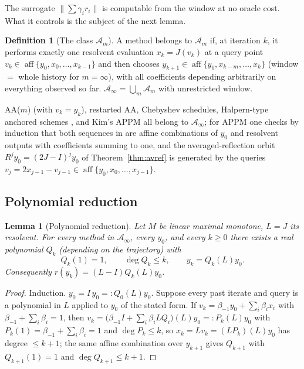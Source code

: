 \documentclass[11pt]{article}
\newtheorem{lemma}[theorem]{Lemma}
\theoremstyle{definition}
\newtheorem{definition}[theorem]{Definition}
\theoremstyle{remark}
\DeclareMathOperator{\aff}{aff}
\newcommand{\Aa}{\mathcal{A}}
\newcommand{\norm}[1]{\| #1 \|}
\begin{document}
The surrogate $\norm{\sum\gamma_i r_i}$ is computable from the window at no
oracle cost. What it controls is the subject of the next lemma.

\begin{definition}[The class $\Aa_m$]\label{def:class}
A method belongs to $\Aa_m$ if, at iteration $k$, it performs exactly one
resolvent evaluation $x_k=J(v_k)$ at a query point
$v_k\in\aff\{y_0,x_0,\dots,x_{k-1}\}$ and then chooses
$y_{k+1}\in\aff\{y_0,x_{k-m},\dots,x_k\}$ (window $=$ whole history for
$m=\infty$), with all coefficients depending arbitrarily on everything
observed so far. $\Aa_\infty=\bigcup_m \Aa_m$ with unrestricted window.
\end{definition}

AA($m$) (with $v_k=y_k$), restarted AA, Chebyshev schedules, Halpern-type
anchored schemes \cite{halpern1967fixed,yoon2021accelerated}, and Kim's APPM
\cite{kim2021accelerated} all belong to $\Aa_\infty$; for APPM one checks by
induction that both sequences in \cite[Alg.~1]{kim2021accelerated} are
affine combinations of $y_0$ and resolvent outputs with coefficients summing
to one, and the averaged-reflection orbit $R^jy_0=(2J-I)^jy_0$ of
Theorem~\ref{thm:avref} is generated by the queries
$v_j=2x_{j-1}-v_{j-1}\in\aff\{y_0,x_0,\dots,x_{j-1}\}$.

\subsection{Polynomial reduction}

\begin{lemma}[Polynomial reduction]\label{lem:polyred}
Let $M$ be linear maximal monotone, $L=J$ its resolvent. For every method in
$\Aa_\infty$, every $y_0$, and every $k\ge0$ there exists a real polynomial
$Q_k$ (depending on the trajectory) with
\begin{equation}
Q_k(1)=1,\qquad \deg Q_k\le k,\qquad y_k=Q_k(L)y_0.
\end{equation}
Consequently $r(y_k)=(L-I)Q_k(L)y_0$.
\end{lemma}
\begin{proof}
Induction. $y_0=I\,y_0=:Q_0(L)y_0$. Suppose every past iterate and query is
a polynomial in $L$ applied to $y_0$ of the stated form. If
$v_k=\beta_{-1}y_0+\sum_i\beta_i x_i$ with
$\beta_{-1}+\sum_i\beta_i=1$, then
$v_k=\big(\beta_{-1}I+\sum_i\beta_i LQ_i\big)(L)y_0=:P_k(L)y_0$ with
$P_k(1)=\beta_{-1}+\sum_i\beta_i=1$ and $\deg P_k\le k$, so
$x_k=Lv_k=(LP_k)(L)y_0$ has degree $\le k+1$; the same affine combination
over $y_{k+1}$ gives $Q_{k+1}$ with $Q_{k+1}(1)=1$ and
$\deg Q_{k+1}\le k+1$.
\end{proof}
\end{document}
